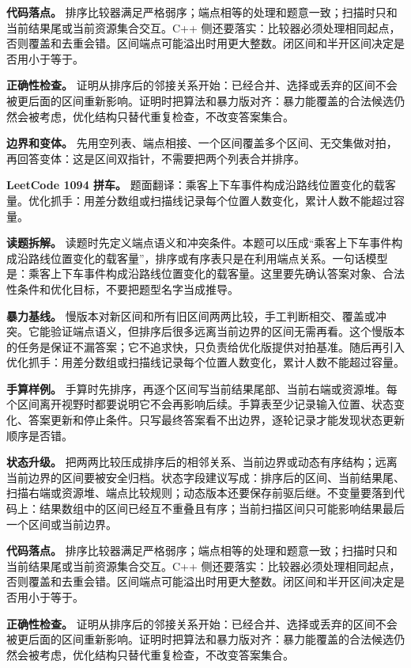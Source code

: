 \textbf{代码落点。} 排序比较器满足严格弱序；端点相等的处理和题意一致；扫描时只和当前结果尾或当前资源集合交互。C++ 侧还要落实：比较器必须处理相同起点，否则覆盖和去重会错。区间端点可能溢出时用更大整数。闭区间和半开区间决定是否用小于等于。

\textbf{正确性检查。} 证明从排序后的邻接关系开始：已经合并、选择或丢弃的区间不会被更后面的区间重新影响。证明时把算法和暴力版对齐：暴力能覆盖的合法候选仍然会被考虑，优化结构只替代重复检查，不改变答案集合。

\textbf{边界和变体。} 先用空列表、端点相接、一个区间覆盖多个区间、无交集做对拍，再回答变体：这是区间双指针，不需要把两个列表合并排序。

\noindent\textbf{LeetCode 1094 拼车。} 题面翻译：乘客上下车事件构成沿路线位置变化的载客量。优化抓手：用差分数组或扫描线记录每个位置人数变化，累计人数不能超过容量。

\textbf{读题拆解。} 读题时先定义端点语义和冲突条件。本题可以压成“乘客上下车事件构成沿路线位置变化的载客量”，排序或有序表只是在利用端点关系。一句话模型是：乘客上下车事件构成沿路线位置变化的载客量。这里要先确认答案对象、合法性条件和优化目标，不要把题型名字当成推导。

\textbf{暴力基线。} 慢版本对新区间和所有旧区间两两比较，手工判断相交、覆盖或冲突。它能验证端点语义，但排序后很多远离当前边界的区间无需再看。这个慢版本的任务是保证不漏答案；它不追求快，只负责给优化版提供对拍基准。随后再引入优化抓手：用差分数组或扫描线记录每个位置人数变化，累计人数不能超过容量。

\textbf{手算样例。} 手算时先排序，再逐个区间写当前结果尾部、当前右端或资源堆。每个区间离开视野时都要说明它不会再影响后续。手算表至少记录输入位置、状态变化、答案更新和停止条件。只写最终答案看不出边界，逐轮记录才能发现状态更新顺序是否错。

\textbf{状态升级。} 把两两比较压成排序后的相邻关系、当前边界或动态有序结构；远离当前边界的区间要被安全归档。状态字段建议写成：排序后的区间、当前结果尾、扫描右端或资源堆、端点比较规则；动态版本还要保存前驱后继。不变量要落到代码上：结果数组中的区间已经互不重叠且有序；当前扫描区间只可能影响结果最后一个区间或当前边界。

\textbf{代码落点。} 排序比较器满足严格弱序；端点相等的处理和题意一致；扫描时只和当前结果尾或当前资源集合交互。C++ 侧还要落实：比较器必须处理相同起点，否则覆盖和去重会错。区间端点可能溢出时用更大整数。闭区间和半开区间决定是否用小于等于。

\textbf{正确性检查。} 证明从排序后的邻接关系开始：已经合并、选择或丢弃的区间不会被更后面的区间重新影响。证明时把算法和暴力版对齐：暴力能覆盖的合法候选仍然会被考虑，优化结构只替代重复检查，不改变答案集合。

